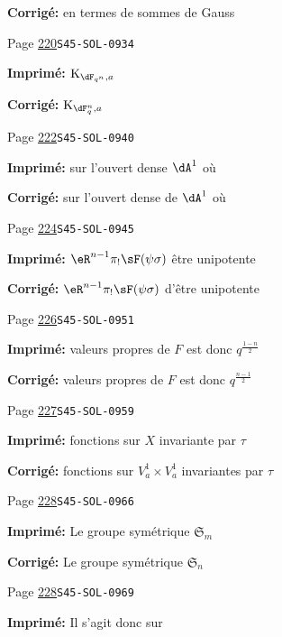 \documentclass[oneside]{book}
\newcommand{\kloos}{\textnormal{K}} %
\theoremstyle{sga-source}
\theoremstyle{sga-source-dash}
\theoremstyle{sga-source-dotdash}
\theoremstyle{sga-source-number-note-dash}
\theoremstyle{sga-source-note-number-dotdash}
\theoremstyle{sga-source-example-dotdash}
\theoremstyle{sga-source-inline-number}
\theoremstyle{sga-source-bare-number}
\theoremstyle{sga-source}
\begin{document}
\begin{description}
\par\noindent\textbf{Corrigé:} en termes de sommes de Gauss
\smallskip
\item[\hypertarget{apparatus:FR-0234}{234}] Page \hyperlink{printpage:fr:220}{220}\quad\texttt{S45-SOL-0934}
\par\noindent\textbf{Imprimé:} \(\kloos_{\dF_{q^n},a}\)
\par\noindent\textbf{Corrigé:} \(\kloos_{\dF_q^n,a}\)
\smallskip
\item[\hypertarget{apparatus:FR-0235}{235}] Page \hyperlink{printpage:fr:222}{222}\quad\texttt{S45-SOL-0940}
\par\noindent\textbf{Imprimé:} sur l'ouvert dense $\dA^1$ où
\par\noindent\textbf{Corrigé:} sur l'ouvert dense de $\dA^1$ où
\smallskip
\item[\hypertarget{apparatus:FR-0236}{236}] Page \hyperlink{printpage:fr:224}{224}\quad\texttt{S45-SOL-0945}
\par\noindent\textbf{Imprimé:} $\eR^{n-1} \pi_! \sF(\psi\sigma)$ être unipotente
\par\noindent\textbf{Corrigé:} $\eR^{n-1} \pi_! \sF(\psi\sigma)$ d'être unipotente
\smallskip
\item[\hypertarget{apparatus:FR-0237}{237}] Page \hyperlink{printpage:fr:226}{226}\quad\texttt{S45-SOL-0951}
\par\noindent\textbf{Imprimé:} valeurs propres de $F$ est donc $q^{\frac{1-n}{2}}$
\par\noindent\textbf{Corrigé:} valeurs propres de $F$ est donc $q^{\frac{n-1}{2}}$
\smallskip
\item[\hypertarget{apparatus:FR-0238}{238}] Page \hyperlink{printpage:fr:227}{227}\quad\texttt{S45-SOL-0959}
\par\noindent\textbf{Imprimé:} fonctions sur $X$ invariante par $\tau$
\par\noindent\textbf{Corrigé:} fonctions sur $V_a^1\times V_a^1$ invariantes par $\tau$
\smallskip
\item[\hypertarget{apparatus:FR-0239}{239}] Page \hyperlink{printpage:fr:228}{228}\quad\texttt{S45-SOL-0966}
\par\noindent\textbf{Imprimé:} Le groupe symétrique $\mathfrak{S}_m$
\par\noindent\textbf{Corrigé:} Le groupe symétrique $\mathfrak{S}_n$
\smallskip
\item[\hypertarget{apparatus:FR-0240}{240}] Page \hyperlink{printpage:fr:228}{228}\quad\texttt{S45-SOL-0969}
\par\noindent\textbf{Imprimé:} Il s'agit donc sur

\end{description}
\end{document}
